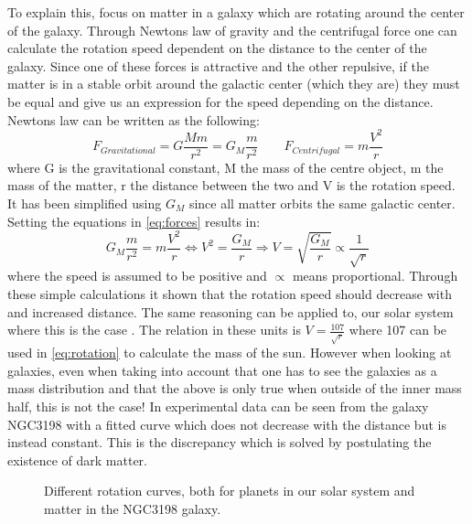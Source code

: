 To explain this, focus on matter in a galaxy which are rotating around the center of the galaxy. Through Newtons law of gravity and the centrifugal force one can calculate the rotation speed dependent on the distance to the center of the galaxy. Since one of these forces is attractive and the other repulsive, if the matter is in a stable orbit around the galactic center (which they are) they must be equal and give us an expression for the speed depending on the distance. Newtons law can be written as the following:
\begin{equation}\label{eq:forces}
F_{Gravitational}=G \frac{M m}{r^2} = G_M \frac{m}{r^2} \qquad F_{Centrifugal} = m\frac{V^2}{r}
\end{equation}
where G is the gravitational constant, M the mass of the centre object, m the mass of the matter, r the distance between the two and V is the rotation speed. It has been simplified using $G_M$ since all matter orbits the same galactic center. Setting the equations in \eqref{eq:forces} results in:
\begin{equation}\label{eq:rotation}
G_M \frac{m}{r^2} = m\frac{V^2}{r} \Leftrightarrow V^2 =\frac{G_M}{r} \Rightarrow V=\sqrt{\frac{G_M}{r}} \propto \frac{1}{\sqrt{r}}
\end{equation}
where the speed is assumed to be positive and $\propto$ means proportional. Through these simple calculations it shown that the rotation speed should decrease with and increased distance. The same reasoning can be applied to, our solar system where this is the case . The relation in these units is $V=\frac{107}{\sqrt{r}}$ where 107 can be used in \eqref{eq:rotation} to calculate the mass of the sun. However when looking at galaxies, even when taking into account that one has to see the galaxies as a mass distribution and that the above is only true when outside of the inner mass half, this is not the case! In  experimental data can be seen from the galaxy NGC3198 with a fitted curve which does not decrease with the distance but is instead constant.  This is the discrepancy which is solved by postulating the existence of dark matter.
 \begin{figure}[H] %
    \hfill
    \caption{Different rotation curves, both for planets in our solar system and matter in the NGC3198 galaxy.}
    \label{fig:rotation}
  \end{figure}

